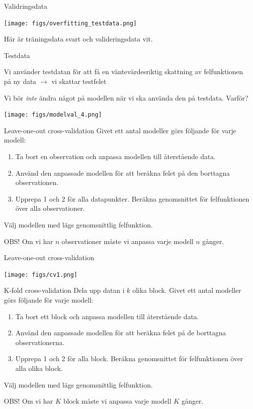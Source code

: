 \documentclass[10pt,english]{beamer}
\begin{document}
\begin{frame}{Validringsdata}
    
    \texttt{[image: figs/overfitting\_testdata.png]}

    Här är träningsdata svart och valideringsdata vit.

\end{frame}

\begin{frame}{Testdata}
    
    Vi använder testdatan för att få en väntevärdesriktig skattning av felfunktionen på ny data $\rightarrow$ vi skattar testfelet

    Vi bör \emph{inte} ändra något på modellen när vi ska använda den på testdata. Varför?

    \texttt{[image: figs/modelval\_4.png]}

\end{frame}

\begin{frame}{Leave-one-out cross-validation}
    Givet ett antal modeller görs följande för varje modell:
    \begin{enumerate}
        \item Ta bort en observation och anpassa modellen till återstående data.
        \item Använd den anpassade modellen för att beräkna felet på den borttagna observationen.
        \item Upprepa 1 och 2 för alla datapunkter. Beräkna genomsnittet för felfunktionen över alla observationer.
    \end{enumerate}
    Välj modellen med lägs genomsnittlig felfunktion.

    OBS! Om vi har $n$ observationer måste vi anpassa varje modell $n$ gånger.
\end{frame}

\begin{frame}{Leave-one-out cross-validation}
    \begin{center}
        \texttt{[image: figs/cv1.png]}
    \end{center}
\end{frame}

\begin{frame}{K-fold cross-validation}
    Dela upp datan i $k$ olika block. Givet ett antal modeller görs följande för varje modell:
    \begin{enumerate}
        \item Ta bort ett block och anpassa modellen till återstående data.
        \item Använd den anpassade modellen för att beräkna felet på de borttagna observationerna.
        \item Upprepa 1 och 2 för alla block. Beräkna genomsnittet för felfunktionen över alla olika block.
    \end{enumerate}
    Välj modellen med lägs genomsnittlig felfunktion.

    OBS! Om vi har $K$ block måste vi anpassa varje modell $K$ gånger.
\end{frame}
\end{document}

